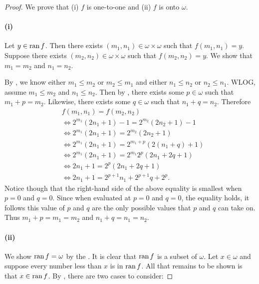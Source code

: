 \documentclass{report}
\begin{document}
  \begin{proof}

    We prove that (i) $f$ is one-to-one and (ii) $f$ is onto $\omega$.

    \paragraph{(i)}%

      Let $y \in \mathop{\text{ran}}{f}$.
      Then there exists $(m_1, n_1) \in \omega \times \omega$ such that
        $f(m_1, n_1) = y$.
      Suppose there exists $(m_2, n_2) \in \omega \times \omega$ such that
        $f(m_2, n_2) = y$.
      We show that $m_1 = m_2$ and $n_1 = n_2$.

      By , we know either
        $m_1 \leq m_2$ or $m_2 \leq m_1$ and either $n_1 \leq n_2$ or
        $n_2 \leq n_1$.
      WLOG, assume $m_1 \leq m_2$ and $n_1 \leq n_2$.
      Then by , there exists some $p \in \omega$ such
        that $m_1 + p = m_2$.
      Likewise, there exists some $q \in \omega$ such that $n_1 + q = n_2$.
      Therefore
        \begin{align*}
          & f(m_1, n_1) = f(m_2, n_2) \\
          & \iff 2^{m_1}(2n_1 + 1) - 1 = 2^{m_2}(2n_2 + 1) - 1 \\
          & \iff 2^{m_1}(2n_1 + 1) = 2^{m_2}(2n_2 + 1) \\
          & \iff 2^{m_1}(2n_1 + 1) = 2^{m_1+p}(2(n_1 + q) + 1) \\
          & \iff 2^{m_1}(2n_1 + 1) = 2^{m_1}2^p(2n_1 + 2q + 1) \\
          & \iff 2n_1 + 1 = 2^p(2n_1 + 2q + 1) \\
          & \iff 2n_1 + 1 = 2^{p+1}n_1 + 2^{p+1}q + 2^p.
        \end{align*}
      Notice though that the right-hand side of the above equality is smallest
        when $p = 0$ and $q = 0$.
      Since when evaluated at $p = 0$ and $q = 0$, the equality holds, it
        follows this value of $p$ and $q$ are the only possible values that
        $p$ and $q$ can take on.
      Thus $m_1 + p = m_1 = m_2$ and $n_1 + q = n_1 = n_2$.

    \paragraph{(ii)}%

      We show $\mathop{\text{ran}}{f} = \omega$ by the
        .
      It is clear that $\mathop{\text{ran}}{f}$ is a subset of $\omega$.
      Let $x \in \omega$ and suppose every number less than $x$ is in $\mathop{\text{ran}}{f}$.
      All that remains to be shown is that $x \in \mathop{\text{ran}}{f}$.
      By , there are two cases to consider:


\end{proof}
\end{document}
